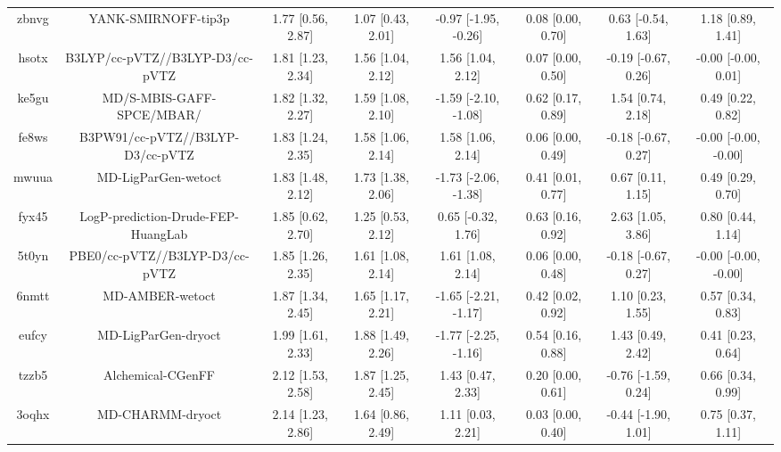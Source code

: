 \documentclass{article}
\begin{document}
\begin{center}
\begin{longtable}{|cccccccc|}
 zbnvg &                                YANK-SMIRNOFF-tip3p &  1.77 [0.56, 2.87] &  1.07 [0.43, 2.01] &  -0.97 [-1.95, -0.26] &  0.08 [0.00, 0.70] &   0.63 [-0.54, 1.63] &     1.18 [0.89, 1.41] \\
 hsotx &                    B3LYP/cc-pVTZ//B3LYP-D3/cc-pVTZ &  1.81 [1.23, 2.34] &  1.56 [1.04, 2.12] &     1.56 [1.04, 2.12] &  0.07 [0.00, 0.50] &  -0.19 [-0.67, 0.26] &   -0.00 [-0.00, 0.01] \\
 ke5gu &                          MD/S-MBIS-GAFF-SPCE/MBAR/ &  1.82 [1.32, 2.27] &  1.59 [1.08, 2.10] &  -1.59 [-2.10, -1.08] &  0.62 [0.17, 0.89] &    1.54 [0.74, 2.18] &     0.49 [0.22, 0.82] \\
 fe8ws &                   B3PW91/cc-pVTZ//B3LYP-D3/cc-pVTZ &  1.83 [1.24, 2.35] &  1.58 [1.06, 2.14] &     1.58 [1.06, 2.14] &  0.06 [0.00, 0.49] &  -0.18 [-0.67, 0.27] &  -0.00 [-0.00, -0.00] \\
 mwuua &                                MD-LigParGen-wetoct &  1.83 [1.48, 2.12] &  1.73 [1.38, 2.06] &  -1.73 [-2.06, -1.38] &  0.41 [0.01, 0.77] &    0.67 [0.11, 1.15] &     0.49 [0.29, 0.70] \\
 fyx45 &                 LogP-prediction-Drude-FEP-HuangLab &  1.85 [0.62, 2.70] &  1.25 [0.53, 2.12] &    0.65 [-0.32, 1.76] &  0.63 [0.16, 0.92] &    2.63 [1.05, 3.86] &     0.80 [0.44, 1.14] \\
 5t0yn &                     PBE0/cc-pVTZ//B3LYP-D3/cc-pVTZ &  1.85 [1.26, 2.35] &  1.61 [1.08, 2.14] &     1.61 [1.08, 2.14] &  0.06 [0.00, 0.48] &  -0.18 [-0.67, 0.27] &  -0.00 [-0.00, -0.00] \\
 6nmtt &                                    MD-AMBER-wetoct &  1.87 [1.34, 2.45] &  1.65 [1.17, 2.21] &  -1.65 [-2.21, -1.17] &  0.42 [0.02, 0.92] &    1.10 [0.23, 1.55] &     0.57 [0.34, 0.83] \\
 eufcy &                                MD-LigParGen-dryoct &  1.99 [1.61, 2.33] &  1.88 [1.49, 2.26] &  -1.77 [-2.25, -1.16] &  0.54 [0.16, 0.88] &    1.43 [0.49, 2.42] &     0.41 [0.23, 0.64] \\
 tzzb5 &                                  Alchemical-CGenFF &  2.12 [1.53, 2.58] &  1.87 [1.25, 2.45] &     1.43 [0.47, 2.33] &  0.20 [0.00, 0.61] &  -0.76 [-1.59, 0.24] &     0.66 [0.34, 0.99] \\
 3oqhx &                                   MD-CHARMM-dryoct &  2.14 [1.23, 2.86] &  1.64 [0.86, 2.49] &     1.11 [0.03, 2.21] &  0.03 [0.00, 0.40] &  -0.44 [-1.90, 1.01] &     0.75 [0.37, 1.11] \\

\end{longtable}
\end{center}
\end{document}
